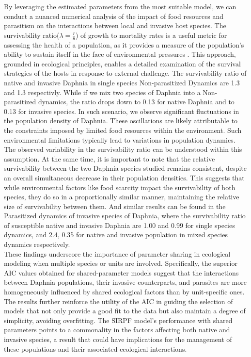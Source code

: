 \documentclass[12pt]{article}
\begin{document}
By leveraging the estimated parameters from the most suitable model, we can conduct a nuanced numerical analysis of the impact of food resources and parasitism on the interactions between local and invasive host species. The survivability ratio($ \lambda = \frac{r}{\theta}$) of growth to mortality rates is a useful metric for assessing the health of a population, as it provides a measure of the population's ability to sustain itself in the face of environmental pressures \citep{ma2021unified}. This approach, grounded in ecological principles, enables a detailed examination of the survival strategies of the hosts in response to external challenge. The survivability ratio of native and invasive Daphnia in single species Non-parasitized Dynamics are 1.3 and 1.3 respectivly. While if we mix two species of Daphnia into a Non-parasitized dynamics, the ratio drops down to 0.13 for native Daphnia and to 0.13 for invasive species. In such scenario, we observe significant fluctuations in the population density of Daphnia. These oscillations are likely attributable to the constraints imposed by limited food resources within the environment. Such environmental limitations typically lead to variations in population dynamics. The observed variability in the survivability ratio can be understood within this assumption. At the same time, it is important to note that the relative survivability between the two Daphnia species studied remains consistent, despite an overall simultaneous decrease in their population densities. This suggests that while environmental factors like food scarcity impact the survivability of both species, they do so in a proportionally similar manner, maintaining the relative size of survivability between them. And similar results can be found in the Parasitized dynamics of invasive species of Daphnia, where the survivability ratio of susceptible native and invasive Daphnia are 1.00 and 0.99 for single species dynamics, and 2.4, 0.35 for native and invasive population in mixed species dynamics respectively.\\

These findings underscore the importance of parameter sharing in ecological modeling when multiple species or units are involved. Specifically, the superior AIC values obtained for shared-parameter models suggest that the interactions between Daphnia populations, their invasive counterparts, and parasites are more homogeneously influenced by shared ecological factors than by unit-specific ones. The results further reinforce the utility of the AIC in guiding the selection of models that not only provide a good fit to the data but also maintain a degree of simplicity, avoiding overfitting. The SIRPF model's performance with shared parameters points to a commonality in the factors affecting both native and invasive species, a result that could have implications for the management of these populations and their associated ecological interactions.\\
\end{document}
